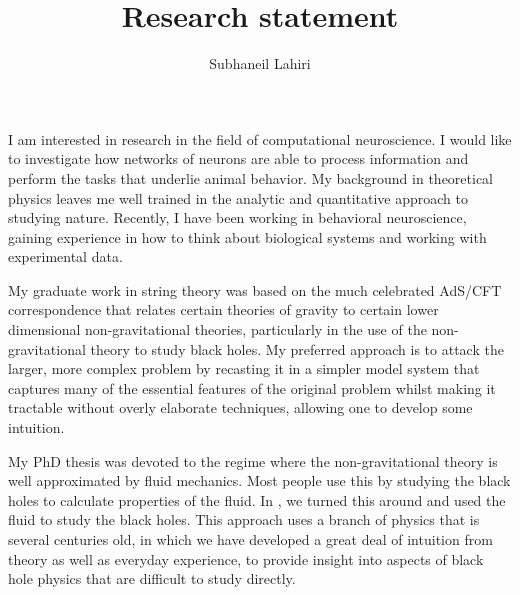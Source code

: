 \documentclass[10pt,oneside]{article}
\title{Research statement}
\author{Subhaneil Lahiri}
\date{}
\begin{document}
\maketitle
\thispagestyle{empty}







I am interested in research in the field of computational neuroscience. I would like to investigate how networks of neurons are able to process information and perform the tasks that underlie animal behavior. My background in theoretical physics leaves me well trained in the analytic and quantitative approach to studying nature. Recently, I have been working in behavioral neuroscience, gaining experience in how to think about biological systems and working with experimental data.


My graduate work in string theory was based on the much celebrated AdS/CFT correspondence that relates certain theories of gravity to certain lower dimensional non-gravitational theories, particularly in the use of the non-gravitational theory to study black holes. My preferred approach is to attack the larger, more complex problem by recasting it in a simpler model system that captures many of the essential features of the original problem whilst making it tractable without overly elaborate techniques, allowing one to develop some intuition.

My PhD thesis was devoted to the regime where the non-gravitational theory is well approximated by fluid mechanics. Most people use this by studying the black holes to calculate properties of the fluid. In \cite{Lahiri:2007ae,*Bhattacharyya:2007vs,*Bhattacharya:2009gm}, we turned this around and used the fluid to study the black holes. This approach uses a branch of physics that is several centuries old, in which we have developed a great deal of intuition from theory as well as everyday experience, to provide insight into aspects of black hole physics that are difficult to study directly.
\end{document}
